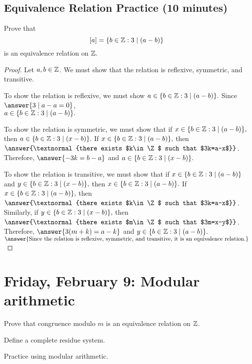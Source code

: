 \documentclass[letterpaper, 11 pt]{ximera}
\begin{document}
\subsection{Equivalence Relation Practice (10 minutes)}

\begin{br}
    Prove that \[[a]=\{b\in\mathbb Z: 3\mid(a-b)\}\] is an equivalence relation on $\mathbb Z.$
  \end{br}
  
  \begin{proof}
    Let $a,b\in\mathbb Z$. We must show that the relation is reflexive, symmetric, and transitive.
  
     To show the relation is reflexive, we must show $a\in \{b\in\mathbb Z: 3\mid(a-b)\}.$ Since $\answer{3\mid a-a=0}$,\\
     $a\in \{b\in\mathbb Z: 3\mid(a-b)\}.$
  
     To show the relation is symmetric, we must show that if $x\in \{b\in\mathbb Z: 3\mid(a-b)\},$ then $a\in \{b\in\mathbb Z: 3\mid(x-b)\}.$ If $x\in \{b\in\mathbb Z: 3\mid(a-b)\},$ then $\answer{\textnormal{there exists $k\in\Z$ such that $3k=a-x$}}$. Therefore, $\answer{-3k=b-a}$
     and $a\in \{b\in\mathbb Z: 3\mid(x-b)\}.$
  
     To show the relation is transitive, we must show that if $x\in \{b\in\mathbb Z: 3\mid(a-b)\}$ and $y\in \{b\in\mathbb Z: 3\mid(x-b)\},$ then $x\in \{b\in\mathbb Z: 3\mid(a-b)\}.$ If $x\in \{b\in\mathbb Z: 3\mid(a-b)\},$ then $\answer{\textnormal{there exists $k\in\Z$ such that $3k=a-x$}}$. 
     Similarly, if $y\in \{b\in\mathbb Z: 3\mid(x-b)\},$ then $\answer{\textnormal{there exists $m\in\Z$ such that $3m=x-y$}}$.
     Therefore, $\answer{3(m+k)=a-k}$
     and $y\in \{b\in\mathbb Z: 3\mid(a-b)\}.$ $\answer{\textnormal{Since the relation is reflexive, symmetric, and transitive, it is an equivalence relation.}}$
  \end{proof}

\section{Friday, February 9: Modular arithmetic}
\begin{obj}
\item Prove that congruence modulo $m$ is an equivalence relation on $\mathbb Z$.
\item Define a complete residue system.
\item Practice using modular arithmetic.
\end{obj}
\end{document}
